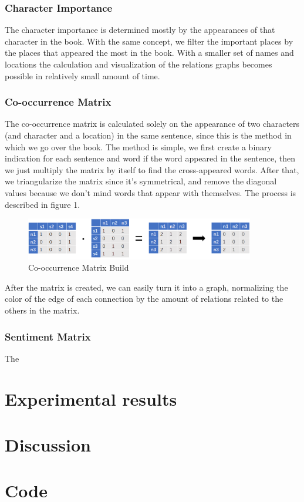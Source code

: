 \documentclass{article}
\begin{document}
\subsubsection{Character Importance}
The character importance is determined mostly by the appearances of that character in the book. With the same concept, we filter the important places by the places that appeared the most in the book. With a smaller set of names and locations the calculation and visualization of the relations graphs becomes possible in relatively small amount of time.
\subsubsection{Co-occurrence Matrix}
The co-occurrence matrix is calculated solely on the appearance of two characters (and character and a location) in the same sentence, since this is the method in which we go over the book. The method is simple, we first create a binary indication for each sentence and word if the word appeared in the sentence, then we just multiply the matrix by itself to find the cross-appeared words. After that, we triangularize the matrix since it's symmetrical, and remove the diagonal values because we don't mind words that appear with themselves. The process is described in figure 1.
\begin{figure}[h]
  \centering
  \includegraphics[width=10cm]{co-occurences_defintion.png}
  \caption{Co-occurrence Matrix Build}
  \label{fig1}
\end{figure}
After the matrix is created, we can easily turn it into a graph, normalizing the color of the edge of each connection by the amount of relations related to the others in the matrix.

\subsubsection{Sentiment Matrix}
The 

\section{Experimental results}

\section{Discussion}

\section{Code}




\end{document}
